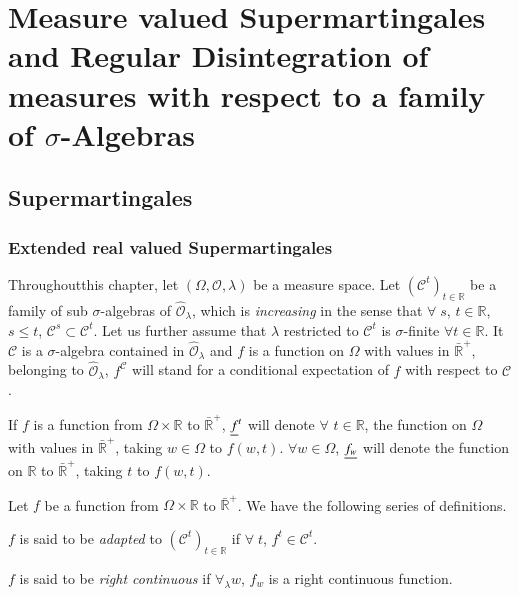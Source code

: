 
\part[Measure valued Supermartingales and...]{Measure valued
  Supermartingales and Regular Disintegration of 
  measures with respect to a family of $\sigma$-Algebras}\label{part2}

\chapter{Supermartingales}\label{part2:chap4}

\section{Extended real valued Supermartingales}\label{part2:chap4:sec1}

\setcounter{pageoriginal}{68}
Throughout\pageoriginale this chapter, let $(\Omega, \mathscr{O},
\lambda)$ be a measure space. Let $(\mathscr{C}^t)_{t \in \mathbb{R}}$
be a family of sub $\sigma$-algebras of $\hat{\mathscr{O}}_\lambda$,
which is {\em increasing} in the sense that $\forall \; s$, $t \in
\mathbb{R}$, $s \leq t$, $\mathscr{C}^s \subset \mathscr{C}^t$. Let us
further assume that $\lambda$ restricted to $\mathscr{C}^t$ is
$\sigma$-finite $\forall t \in \mathbb{R}$. It $\mathscr{C}$ is a
$\sigma$-algebra contained in $\hat{\mathscr{O}}_\lambda$ and $f$ is a
function on $\Omega$ with values in $\bar{\mathbb{R}}^+$, belonging to
$\hat{\mathscr{O}}_\lambda$, $f^\mathscr{C}$ will stand for a
conditional expectation of $f$ with respect to $\mathscr{C}$. 

If $f$ is a function from $\Omega \times \mathbb{R}$ to
$\bar{\mathbb{R}}^+$, $\underline{f}^t$ will denote $\forall$ $t \in
\mathbb{R}$, the function on $\Omega$ with values in
$\bar{\mathbb{R}}^+$, taking $w \in \Omega$ to $f (w,t)$. $\forall w
\in \Omega$, $\underline{f_w}$ will denote the function on $\mathbb{R}$ to
$\bar{\mathbb{R}}^+$, taking $t$ to $f(w,t)$. 

Let $f$ be a function from $\Omega \times \mathbb{R}$ to
$\bar{\mathbb{R}}^+$. We have the following series of definitions. 


\begin{defn}\label{part2:chap4:def57}
$f$ is said to be {\em adapted} to $(\mathscr{C}^t)_{t \in\mathbb{R}}$
  if $\forall \; t$, $f^t \in \mathscr{C}^t$.
\end{defn}

\begin{defn}\label{part2:chap4:def58}
$f$ is said to be {\em right continuous} if $\forall_\lambda w$, $f_w$
  is a right continuous function. 
\end{defn}

